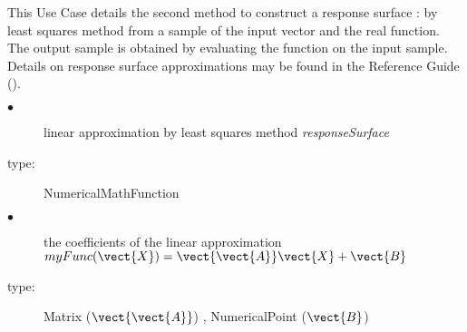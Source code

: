 \renewcommand{\filename}{docUC_RespSurface_LeastSquaresApprox.tex}
\renewcommand{\filetitle}{UC : Linear Least Squares approximation from a sample of the input vector and the real function}

\HeaderIIILevel



\label{leastSquareApprox}




This Use Case  details the second method to construct a response surface : by least squares method from a sample of the input vector and the real function. The output sample is obtained  by evaluating the function on the input sample.\\



Details on response surface approximations may be found in the Reference Guide ().\\


             {
               \begin{description}
               \item[$\bullet$] linear approximation by least squares method {\itshape responseSurface}
               \item[type:] NumericalMathFunction
               \item[$\bullet$]  the coefficients of the linear approximation $myFunc(\vect{X}) = \vect{\vect{A}}\vect{X} + \vect{B}$
               \item[type:] Matrix ($\vect{\vect{A}}$) , NumericalPoint ($\vect{B}$)
               \end{description}
             }

